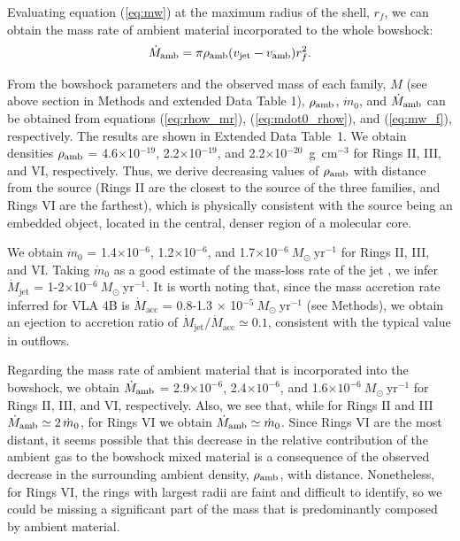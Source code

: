 \documentclass[12pt]{mythesis}
\begin{document}
Evaluating equation (\ref{eq:mw}) at the maximum radius of the shell, $r_{f}$, we can obtain the mass rate of ambient material 
 incorporated to the whole bowshock:
\begin{equation}\label{eq:mw_f}
	\dot{M}_{{\rm amb}}=\pi \rho_{\rm amb} (v_{\rm jet}-v_{\rm amb}) r_{f}^2. 
\end{equation}

From the bowshock parameters and the observed mass of each family, $M$ (see above section in Methods and extended Data Table 1), 
$\rho_{\rm amb}$, $\dot{m}_0$, and $\dot{M}_{{\rm amb}}$ can be obtained from equations (\ref{eq:rhow_mr}), (\ref{eq:mdot0_rhow}), and (\ref{eq:mw_f}), respectively. The results are shown in Extended Data Table~1.  %
We obtain densities $\rho_{\rm amb}$ = 4.6$\times$10$^{-19}$, 2.2$\times$10$^{-19}$, and 2.2$\times$10$^{-20}$~g~cm$^{-3}$ for Rings II, III, and VI, respectively. Thus, we derive decreasing values of $\rho_{\rm amb}$ with distance from the source (Rings II are the closest to the source of the three families, and Rings VI are the farthest), which is physically consistent with the source being an embedded object, located in the central, denser region of a molecular core.

We obtain $\dot{m}_0$ = 1.4$\times$10$^{-6}$, 1.2$\times$10$^{-6}$, and 1.7$\times$10$^{-6}~M_\odot~\mathrm{yr}^{-1}$ for Rings II, III, and VI. Taking $\dot{m}_0$ as a good estimate of the mass-loss rate of the jet , we infer $\dot{M}_\mathrm{jet}$ = 1-2$\times$10$^{-6}~M_\odot~\mathrm{yr}^{-1}$. It is worth noting that, since the mass accretion rate inferred for VLA 4B is $\dot{M}_\mathrm{acc}$ = 0.8-1.3 $\times$ 10$^{-5}~M_\odot~\mathrm{yr}^{-1}$ (see Methods), we obtain an ejection to accretion ratio of $\dot{M}_\mathrm{jet}/\dot{M}_\mathrm{acc}\simeq 0.1$, consistent with the typical value in outflows.

Regarding the mass rate of ambient material that is incorporated into the bowshock, we obtain $\dot{M}_{{\rm amb}}$ = 2.9$\times10^{-6}$, 2.4$\times10^{-6}$, and 1.6$\times10^{-6}~M_\odot~\mathrm{yr}^{-1}$ for Rings II, III, and VI, respectively. Also, we see that, while for Rings II and III $\dot{M}_{{\rm amb}} \simeq 2\,\dot{m}_0$, for Rings VI we obtain $\dot{M}_{{\rm amb}} \simeq \dot{m}_0$. Since Rings VI are the most distant, it seems possible that this decrease in the relative contribution of the ambient gas to the bowshock mixed material is a consequence of the observed decrease in the surrounding ambient density, $\rho_{\rm amb}$, with distance. Nonetheless, for Rings VI, the rings with largest radii are faint and difficult to identify, so we could be missing a significant part of the mass that is predominantly composed by ambient material.
\end{document}
